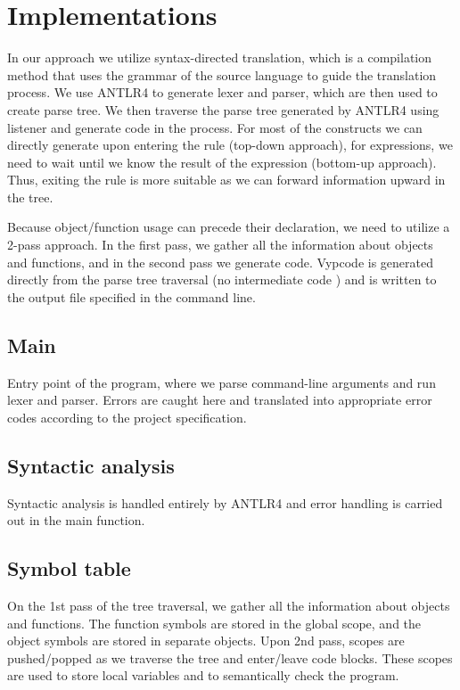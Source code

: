 \documentclass[a4paper,11pt]{article}
\begin{document}
	\section{Implementations}
		In our approach we utilize syntax-directed translation,
        which is a compilation method that uses the grammar of the source language to guide the translation process.
        We use ANTLR4 to generate lexer and parser, which are then used to create parse tree.
        We then traverse the parse tree generated by ANTLR4 using listener and generate code in the process.
        For most of the constructs we can directly generate upon entering the rule (top-down approach),
        for expressions, we need to wait until we know the result of the expression (bottom-up approach).
        Thus, exiting the rule is more suitable as we can forward information upward in the tree.

        Because object/function usage can precede their declaration, we need to utilize a 2-pass approach.
        In the first pass, we gather all the information about objects and functions, and in the second pass we generate code.
        Vypcode is generated directly from the parse tree traversal (no intermediate code ) and is written to the output file specified in the command line.


        \subsection{Main}
            Entry point of the program, where we parse command-line arguments and run lexer and parser.
            Errors are caught here and translated into appropriate error codes according to the project specification.

       \subsection{Syntactic analysis}
            Syntactic analysis is handled entirely by ANTLR4 and error handling is carried out in the main function.

        \subsection{Symbol table}
            On the 1st pass of the tree traversal, we gather all the information about objects and functions.
            The function symbols are stored in the global scope, and the object symbols are stored in separate objects.
            Upon 2nd pass, scopes are pushed/popped as we traverse the tree and enter/leave code blocks.
            These scopes are used to store local variables and to semantically check the program.
\end{document}
